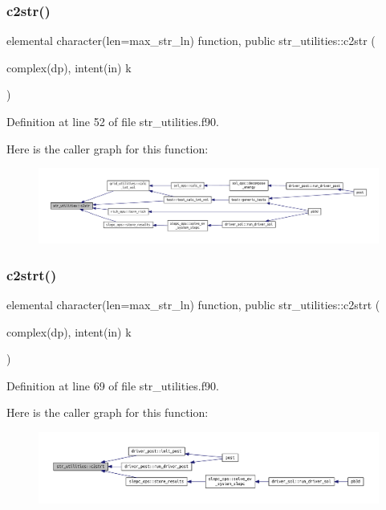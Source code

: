 \subsubsection{\texorpdfstring{c2str()}{c2str()}}
{\footnotesize\ttfamily elemental character(len=max\+\_\+str\+\_\+ln) function, public str\+\_\+utilities\+::c2str (\begin{DoxyParamCaption}\item[{complex(dp), intent(in)}]{k }\end{DoxyParamCaption})}



Definition at line 52 of file str\+\_\+utilities.\+f90.

Here is the caller graph for this function\+:
\nopagebreak
\begin{figure}[H]
\begin{center}
\leavevmode
\includegraphics[width=350pt]{namespacestr__utilities_a308e943e5e244e3e0f852f2ecb3e3183_icgraph}
\end{center}
\end{figure}
\mbox{\label{namespacestr__utilities_abca28d6272d447dc1c0c100624c6ed75}} 
\subsubsection{\texorpdfstring{c2strt()}{c2strt()}}
{\footnotesize\ttfamily elemental character(len=max\+\_\+str\+\_\+ln) function, public str\+\_\+utilities\+::c2strt (\begin{DoxyParamCaption}\item[{complex(dp), intent(in)}]{k }\end{DoxyParamCaption})}



Definition at line 69 of file str\+\_\+utilities.\+f90.

Here is the caller graph for this function\+:
\nopagebreak
\begin{figure}[H]
\begin{center}
\leavevmode
\includegraphics[width=350pt]{namespacestr__utilities_abca28d6272d447dc1c0c100624c6ed75_icgraph}
\end{center}
\end{figure}
\mbox{\label{namespacestr__utilities_a0b97e51770725a3e98ed393d26681414}} 
